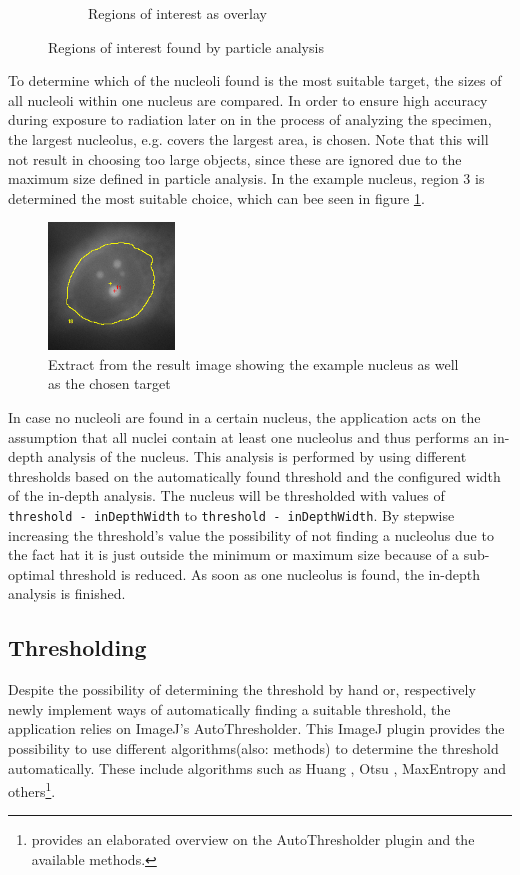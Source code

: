 \documentclass[a4paper, 12pt, twoside]{article}
\newcommand{\code}[1]{\colorbox{codegray}{\texttt{#1}}}
\begin{document}
\begin{figure}[h]
\begin{subfigure}[b]{0.25\textwidth}
\caption{Regions of interest as overlay}
\end{subfigure}
\caption{Regions of interest found by particle analysis}
\end{figure}

To determine which of the nucleoli found is the most suitable target, the sizes
of all nucleoli within one nucleus are compared. In order to ensure high
accuracy during exposure to radiation later on in the process of analyzing the
specimen, the largest nucleolus, e.g. covers the largest area, is chosen. Note
that this will not result in choosing too large objects, since these are ignored
due to the maximum size defined in particle analysis. In the example nucleus,
region 3 is determined the most suitable choice, which can bee seen in figure
\ref{fig:example_nucleus_target}. 

\begin{figure}
\centering
\includegraphics[width=0.3\textwidth]{images/example_nucleus_target}
\caption{Extract from the result image showing the example nucleus as well as
the chosen target}
\label{fig:example_nucleus_target}
\end{figure}

In case no nucleoli are found in a certain nucleus, the application acts on the
assumption that all nuclei contain at least one nucleolus and thus performs an
in-depth analysis of the nucleus. This analysis is performed by using different
thresholds based on the automatically found threshold and the configured width
of the in-depth analysis. The nucleus will be thresholded with values of
\code{threshold - inDepthWidth} to \code{threshold - inDepthWidth}. By
stepwise increasing the threshold's value the possibility of not finding a
nucleolus due to the fact hat it is just outside the minimum or maximum size
because of a sub-optimal threshold is reduced. As soon as one nucleolus is
found, the in-depth analysis is finished.

\subsection{Thresholding}\label{sec:thresholding}
Despite the possibility of determining the threshold by hand or, respectively
newly implement ways of automatically finding a suitable threshold, the
application relies on ImageJ's AutoThresholder. This ImageJ plugin provides the
possibility to use different algorithms(also: methods) to determine the
threshold automatically.
These include algorithms such as Huang \cite{huang93}, Otsu \cite{green10},
MaxEntropy \cite{fiji04} and others\footnote{\cite{landini13} provides an
elaborated overview on the AutoThresholder plugin and the available methods.}.
\end{document}
